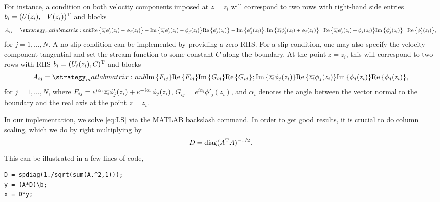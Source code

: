 For instance, a condition on both velocity components imposed at $z=z_i$ will correspond to two rows with right-hand side entries $b_i=(U(z_i), -V(z_i))^{\text{T}}$ and blocks
\begin{equation}
\renewcommand*{\arraystretch}{1.5}
A_{ij}=\matlabmatrix{\real{\conj{z_i}\phi'_j(z_i)-\phi_j(z_i)} -\imag{\conj{z_i}\phi'_j(z_i)-\phi_j(z_i)} \real{\phi'_j(z_i)} -\imag{\phi'_j(z_i)}; 
\imag{\conj{z_i}\phi'_j(z_i)+\phi_j(z_i)} \phantom{+}\real{\conj{z_i}\phi'_j(z_i)+\phi_j(z_i)} \imag{\phi'_j(z_i)} \phantom{+}\real{\phi'_j(z_i)}},
\end{equation}
for $j=1,\ldots,N$. A no-slip condition can be implemented by providing a zero RHS.
For a slip condition, one may also specify the velocity component tangential and set the stream function to some constant $C$ along the boundary. At the point $z=z_i$, this will correspond to two rows with RHS $b_i=(U_t(z_i),C)^{\text{T}}$ and blocks
\begin{equation}
\renewcommand*{\arraystretch}{1.5}
A_{ij}=\matlabmatrix{\imag{F_{ij}} \real{F_{ij}} \imag{G_{ij}} \real{G_{ij}}; 
\imag{\conj{z_i}\phi_j(z_i)} \real{\conj{z_i}\phi_j(z_i)} \imag{\phi_j(z_i)} \real{\phi_j(z_i)}},
\end{equation}
for $j=1,\ldots,N$, where $F_{ij}=e^{i\alpha_i}{\overline{z_i}}\phi'_j(z_i)+e^{-i\alpha_i}\phi_j(z_i)$,  $G_{ij}=e^{i\alpha_i}\phi'_j(z_i)$, and $\alpha_i$ denotes the angle between the vector normal to the boundary and the real axis at the point $z=z_i$.

In our implementation, we solve \eqref{eq:LS} via the MATLAB backslash command. In order to get good results, it is crucial to do column scaling, which we do by right multiplying by
\begin{equation}
D=\operatorname{diag}( A^{\text{T}} A)^{-1/2}.
\end{equation} 
This can be illustrated in a few lines of code,
\begin{verbatim}
D = spdiag(1./sqrt(sum(A.^2,1)));
y = (A*D)\b; 
x = D*y;
\end{verbatim}


